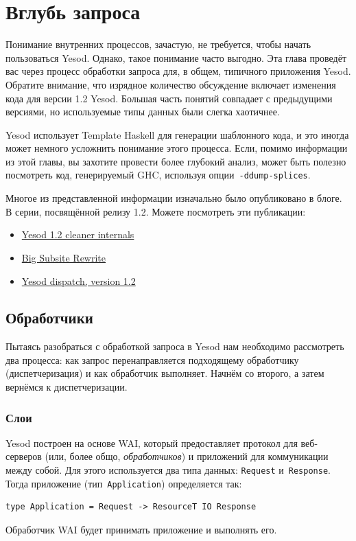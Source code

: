 \chapter{Вглубь запроса}\label{chap:request}

Понимание внутренних процессов, зачастую, не требуется, чтобы начать
пользоваться Yesod. Однако, такое понимание часто выгодно. Эта глава проведёт
вас через процесс обработки запроса для, в общем, типичного приложения Yesod.
Обратите внимание, что изрядное количество обсуждение включает изменения кода
для версии 1.2 Yesod. Большая часть понятий совпадает с предыдущими версиями,
но используемые типы данных были слегка хаотичнее.

Yesod использует Template Haskell для генерации шаблонного кода, и это иногда
может немного усложнить понимание этого процесса. Если, помимо информации из
этой главы, вы захотите провести более глубокий анализ, может быть полезно
посмотреть код, генерируемый GHC, используя опции~\texttt{-ddump-splices}.

\begin{remark}
    Многое из представленной информации изначально было опубликовано в блоге. В
    серии, посвящённой релизу 1.2. Можете посмотреть эти публикации:

    \begin{itemize}
        \item \href{http://www.yesodweb.com/blog/2013/03/yesod-1-2-cleaner-internals}%
            {Yesod 1.2 cleaner internals}

        \item \href{http://www.yesodweb.com/blog/2013/03/big-subsite-rewrite}%
            {Big Subsite Rewrite}

        \item \href{http://www.yesodweb.com/blog/2013/03/yesod-dispatch-version-1-2}%
            {Yesod dispatch, version 1.2}
    \end{itemize}
\end{remark}

\section{Обработчики}
Пытаясь разобраться с обработкой запроса в Yesod нам необходимо рассмотреть два
процесса: как запрос перенаправляется подходящему обработчику (диспетчеризация)
и как обработчик выполняет. Начнём со второго, а затем вернёмся к
диспетчеризации.

\subsection{Слои}
Yesod построен на основе WAI, который предоставляет протокол для веб-серверов
(или, более общо, \emph{обработчиков}) и приложений для коммуникации между
собой. Для этого используется два типа данных: \lstinline'Request'
и~\lstinline'Response'. Тогда приложение (тип~\lstinline'Application')
определяется так:
\begin{lstlisting}
type Application = Request -> ResourceT IO Response
\end{lstlisting}
Обработчик WAI будет принимать приложение и выполнять его.

